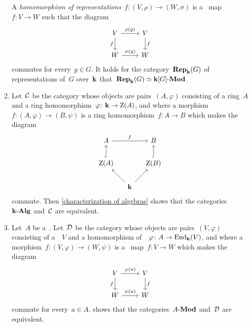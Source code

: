 \begin{example}
\begin{enumerate}
      A \emph{homomorphism of representations}~$f \colon (V, \rho) \to (W,\sigma)$ is a~{\klin} map~$f \colon V \to W$ such that the diagram
      \[
        \begin{tikzcd}
            V
            \arrow{r}[above]{\rho(g)}
            \arrow{d}[left]{f}
          & V
            \arrow{d}[right]{f}
          \\
            W
            \arrow{r}[above]{\sigma(g)}
          & W
        \end{tikzcd}
      \]
      commutes for every~$g \in G$.
      It holds for the category~$\mathbf{Rep}_{\mathbf{k}}(G)$ of representations of~$G$ over~$\kf$ that~$\mathbf{Rep}_{\mathbf{k}}(G) \simeq \text{$\mathbf{k}[G]$-$\mathbf{Mod}$}$.
    \item
      Let~$\mathcal{C}$ be the category whose objects are pairs~$(A, \varphi)$ consisting of a ring~$A$ and a ring homomorphism~$\varphi \colon \mathbf{k} \to \operatorname{Z}(A)$, and where a morphism~$f \colon (A, \varphi) \to (B, \psi)$ is a ring homomorphism~$f \colon A \to B$ which makes the diagram
      \[
        \begin{tikzcd}[column sep = small]
            A
            \arrow{rr}[above]{f}
          & {}
          & B
          \\
            \ringcenter(A)
            \arrow[hook]{u}
          & {}
          & \ringcenter(B)
            \arrow[hook]{u}
          \\
            {}
          & \kf
            \arrow{ul}
            \arrow{ur}
          & {}
        \end{tikzcd}
      \]
      commute.
      Then \cref{characterization of algebras} shows that the categories~$\text{$\mathbf{k}$-$\mathbf{Alg}$}$ and~$\mathcal{C}$ are equivalent.
    \item
      Let~$A$ be a~{\kalg}.
      Let~$\mathcal{D}$ be the category whose objects are pairs~$(V, \varphi)$ consisting of a~{\module{$\kf$}}~$V$ and a homomorphism of~{\kalgs}~$\varphi \colon A \to \operatorname{End}_{\mathbf{k}}(V)$, and where a morphism~$f \colon (V,\varphi) \to (W,\psi)$ is a~{\klin} map~$f \colon V \to W$ which makes the diagram
      \[
        \begin{tikzcd}
            V
            \arrow{r}[above]{\varphi(a)}
            \arrow{d}[left]{f}
          & V
            \arrow{d}[right]{f}
          \\
            W
            \arrow{r}[above]{\psi(a)}
          & W
        \end{tikzcd}
      \]
      commute for every~$a \in A$.
       shows that the categories~$\text{$A$-$\mathbf{Mod}$}$ and~$\mathcal{D}$ are equivalent.
  \end{enumerate}
\end{example}





